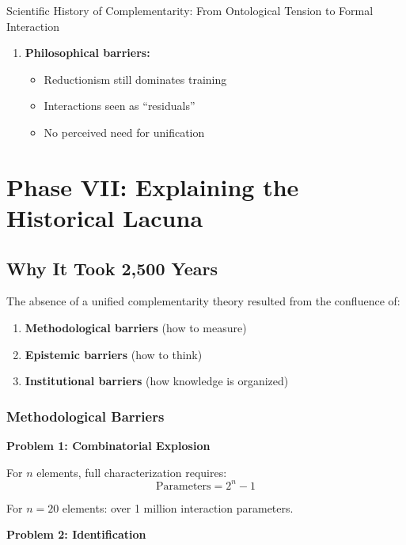 \begin{chapter}{Scientific History of Complementarity: From Ontological Tension to Formal Interaction}
\begin{enumerate}
    \item \textbf{Philosophical barriers:}
    \begin{itemize}[noitemsep]
        \item Reductionism still dominates training
        \item Interactions seen as ``residuals''
        \item No perceived need for unification
    \end{itemize}
\end{enumerate}

\section{Phase VII: Explaining the Historical Lacuna}
\label{sec:phase-vii}

\subsection{Why It Took 2,500 Years}

\begin{tcolorbox}[colback=gray!5!white,colframe=gray!75!black,title=\textbf{Three Types of Barriers}]
The absence of a unified complementarity theory resulted from the confluence of:
\begin{enumerate}
    \item \textbf{Methodological barriers} (how to measure)
    \item \textbf{Epistemic barriers} (how to think)
    \item \textbf{Institutional barriers} (how knowledge is organized)
\end{enumerate}
\end{tcolorbox}

\subsubsection{Methodological Barriers}

\textbf{Problem 1: Combinatorial Explosion}

For $n$ elements, full characterization requires:
\[
\text{Parameters} = 2^n - 1
\]

For $n = 20$ elements: over 1 million interaction parameters.

\textbf{Problem 2: Identification}


\end{chapter}
